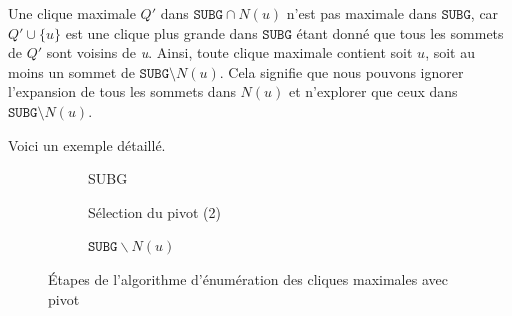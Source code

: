 \documentclass[12pt,a4paper]{article}
\begin{document}
Une clique maximale \( Q' \) dans \(\texttt{SUBG} \cap N(u)\) n'est pas maximale dans \( \texttt{SUBG} \), car \( Q' \cup \{u\} \) est une clique plus grande dans \( \texttt{SUBG} \) étant donné que tous les sommets de \(Q'\) sont voisins de \emph{u}. Ainsi, toute clique maximale contient soit \( u \), soit au moins un sommet de \( \texttt{SUBG} \setminus N(u) \). Cela signifie que nous pouvons ignorer l'expansion de tous les sommets dans \( N(u) \) et n'explorer que ceux dans \( \texttt{SUBG} \setminus N(u) \).

Voici un exemple détaillé.

\begin{figure}[h!]
    \centering
    \begin{subfigure}[b]{0.45\textwidth}
        \centering
        \caption{SUBG}
        \label{fig:initial}
    \end{subfigure}
    \hfill
    \begin{subfigure}[b]{0.45\textwidth}
        \centering
        \caption{Sélection du pivot (2)}
        \label{fig:pivot}
    \end{subfigure}
    \vfill
    \begin{subfigure}[b]{0.5\textwidth}
        \centering
        \caption{\(\texttt{SUBG} \backslash N(u)\) }
        \label{fig:subgraph1}
    \end{subfigure}
    \caption{Étapes de l'algorithme d'énumération des cliques maximales avec pivot}
    \label{fig:cliques_algorithm}
\end{figure}
\end{document}
